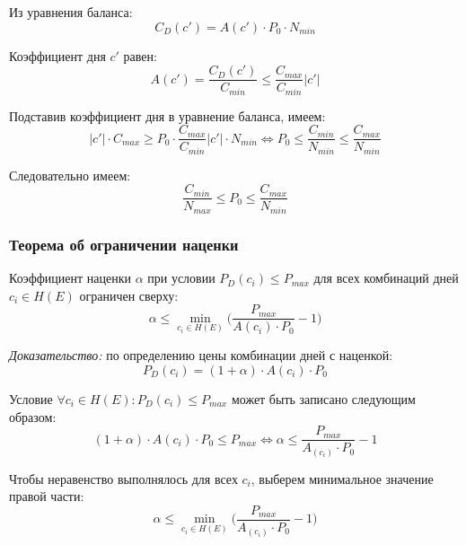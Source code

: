 Из уравнения баланса:
\begin{equation}
	C_D(c') = A(c') \cdot P_0 \cdot N_{min}
\end{equation}

Коэффициент дня $c'$ равен:
\begin{equation}
	A(c') = \frac{C_D(c')}{C_{min}} \le \frac{C_{max}}{C_{min}}|c'|
\end{equation}

Подставив коэффициент дня в уравнение баланса, имеем:
\begin{equation}
	|c'| \cdot C_{max} \ge P_0 \cdot \frac{C_{max}}{C_{min}}|c'| \cdot N_{min} \Leftrightarrow P_0 \le \frac{C_{min}}{N_{min}} \le \frac{C_{max}}{N_{min}}
\end{equation}

Следовательно имеем:
\begin{equation}
	\frac{C_{min}}{N_{max}} \le P_0 \le \frac{C_{max}}{N_{min}}
\end{equation}

\subsubsection{Теорема об ограничении наценки}

Коэффициент наценки $\alpha$ при условии $P_D(c_i) \le P_{max}$ для всех комбинаций дней $c_i \in H(E)$ ограничен сверху:
\begin{equation}
	\alpha \le \min_{c_i \in H(E)}{\Big(\frac{P_{max}}{A(c_i) \cdot P_0} - 1\Big)}
\end{equation}

\textit{Доказательство:} по определению цены комбинации дней с наценкой:
\begin{equation}
	P_D(c_i) = (1 + \alpha) \cdot A(c_i) \cdot P_0
\end{equation}

Условие $\forall c_i \in H(E): P_D(c_i) \le P_{max}$ может быть записано следующим образом:
\begin{equation}
	(1 + \alpha) \cdot A(c_i) \cdot P_0 \le P_{max} \Leftrightarrow \alpha \le \frac{P_{max}}{A_(c_i) \cdot P_0} - 1
\end{equation}

Чтобы неравенство выполнялось для всех $c_i$, выберем минимальное значение правой части:
\begin{equation}
	\alpha \le \min_{c_i \in H(E)}{\Big(\frac{P_{max}}{A_(c_i) \cdot P_0} - 1\Big)}
\end{equation}

